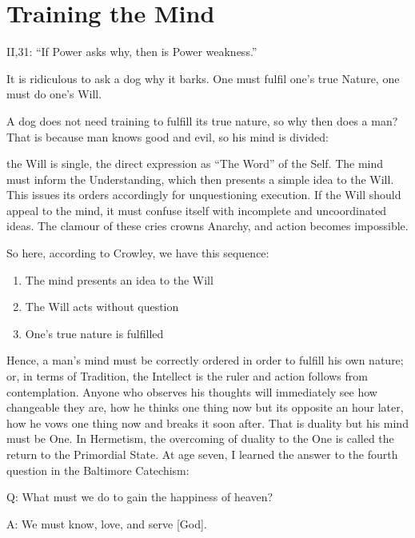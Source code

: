 \section{Training the Mind}

\begin{quotex}
II,31: “If Power asks why, then is Power weakness.”

It is ridiculous to ask a dog why it barks. One must fulfil one's true Nature, one must do one's Will. 

\end{quotex}
A dog does not need training to fulfill its true nature, so why then does a man? That is because man knows good and evil, so his mind is divided:

\begin{quotex}
the Will is single, the direct expression as “The Word” of the Self. The mind must inform the Understanding, which then presents a simple idea to the Will. This issues its orders accordingly for unquestioning execution. If the Will should appeal to the mind, it must confuse itself with incomplete and uncoordinated ideas. The clamour of these cries crowns Anarchy, and action becomes impossible. 

\end{quotex}
So here, according to Crowley, we have this sequence:

\begin{enumerate}
\item The mind presents an idea to the Will 
\item The Will acts without question 
\item One's true nature is fulfilled 
\end{enumerate}
Hence, a man's mind must be correctly ordered in order to fulfill his own nature; or, in terms of Tradition, the Intellect is the ruler and action follows from contemplation. Anyone who observes his thoughts will immediately see how changeable they are, how he thinks one thing now but its opposite an hour later, how he vows one thing now and breaks it soon after. That is duality but his mind must be One. In Hermetism, the overcoming of duality to the One is called the return to the Primordial State. At age seven, I learned the answer to the fourth question in the Baltimore Catechism:

Q: What must we do to gain the happiness of heaven?

A: We must know, love, and serve [God].

